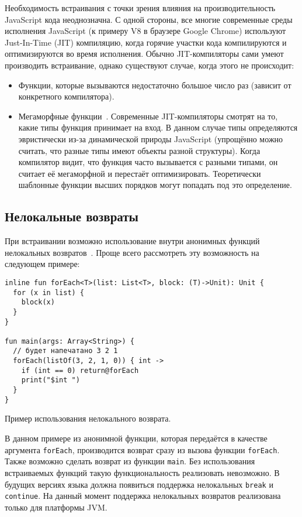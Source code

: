 Необходимость встраивания с точки зрения влияния
на производительность JavaScript кода неоднозначна.
С одной стороны, все многие современные среды исполнения
JavaScript (к примеру V8 в браузере Google Chrome)
используют Just-In-Time (JIT) компиляцию, когда горячие
участки кода компилируются и оптимизируются во
время исполнения. Обычно JIT-компиляторы
сами умеют производить встраивание, однако
существуют случае, когда этого не происходит:
\begin{itemize}
  \item Функции, которые вызываются недостаточно большое число раз (зависит
  от конкретного компилятора).
  \item Мегаморфные функции~\cite{MONOMORPH}. Современные JIT-компиляторы смотрят
  на то, какие типы функция принимает на вход. В данном случае типы
  определяются эвристически из-за динамической природы JavaScript
  (упрощённо можно считать, что разные типы имеют объекты разной структуры).
  Когда компилятор видит, что функция часто вызывается с разными типами,
  он считает её мегаморфной и перестаёт оптимизировать.
  Теоретически шаблонные функции высших порядков могут попадать
  под это определение.

\end{itemize}

\subsection{Нелокальные возвраты}

При встраивании возможно использование внутри анонимных функций
нелокальных возвратов~\cite{NONLOCAL_RETURN}. Проще всего рассмотреть эту возможность на следующем примере:
\begin{listing}[H]
\begin{verbatim}
inline fun forEach<T>(list: List<T>, block: (T)->Unit): Unit {
  for (x in list) {
    block(x)
  }
}

fun main(args: Array<String>) {
  // будет напечатано 3 2 1
  forEach(listOf(3, 2, 1, 0)) { int ->
    if (int == 0) return@forEach
    print("$int ")
  }
}
\end{verbatim}
\caption{Пример использования нелокального возврата.}
\end{listing}

В данном примере из анонимной функции, которая передаётся в качестве
аргумента \texttt{forEach}, производится возврат сразу из вызова
функции \texttt{forEach}. Также возможно сделать возврат из функции \texttt{main}.
Без использования встраиваемых функций такую функциональность
реализовать невозможно. В будущих версиях языка
должна появиться поддержка нелокальных
\texttt{break} и \texttt{continue}.
На данный момент поддержка нелокальных возвратов реализована только
для платформы JVM.

